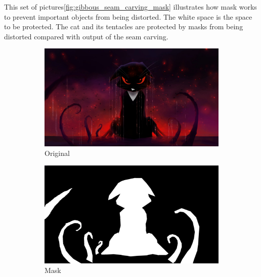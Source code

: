 \documentclass[final]{cvpr}
\begin{document}
This set of pictures\ref{fig:gibbous_seam_carving_mask} illustrates how mask works to prevent important objects from being distorted.
The white space is the space to be protected.
The cat and its tentacles are protected by masks from being distorted compared with output of the seam carving.
\begin{figure}[htb]
\begin{center}
\begin{subfigure}[b]{0.768\linewidth}
    \includegraphics[width=\textwidth]{gibbous.jpg}
    \caption{Original}
\end{subfigure}
\begin{subfigure}[b]{0.768\linewidth}
    \includegraphics[width=\textwidth]{gibbous_mask.jpg}
    \caption{Mask}
\end{subfigure}
\begin{subfigure}[b]{0.48\linewidth}

\end{subfigure}
\end{center}
\end{figure}
\end{document}
